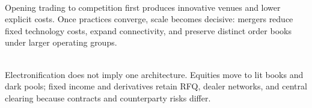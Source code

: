 \documentclass[a4paper,oneside,openany]{book}
\begin{document}
\begin{mechanism} \\
Opening trading to competition first produces innovative venues and lower explicit costs. Once practices converge, scale becomes decisive: mergers reduce fixed technology costs, expand connectivity, and preserve distinct order books under larger operating groups.
\end{mechanism}

\begin{practitionernote} \\
Electronification does not imply one architecture. Equities move to lit books and dark pools; fixed income and derivatives retain RFQ, dealer networks, and central clearing because contracts and counterparty risks differ.
\end{practitionernote}
\end{document}

